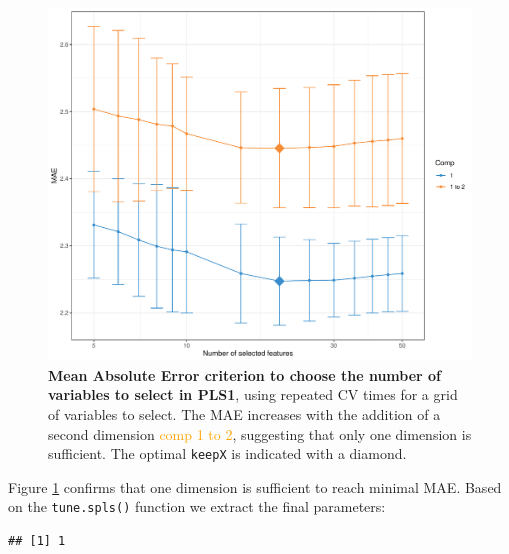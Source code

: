 \documentclass[
]{book}
\newenvironment{Shaded}{\begin{snugshade}}{\end{snugshade}}
\newcommand{\CommentTok}[1]{\textcolor[rgb]{0.56,0.35,0.01}{\textit{#1}}}
\newcommand{\DecValTok}[1]{\textcolor[rgb]{0.00,0.00,0.81}{#1}}
\newcommand{\NormalTok}[1]{#1}
\newcommand{\OtherTok}[1]{\textcolor[rgb]{0.56,0.35,0.01}{#1}}
\newcommand{\SpecialCharTok}[1]{\textcolor[rgb]{0.00,0.00,0.00}{#1}}
\begin{document}
\begin{figure}

{\centering \includegraphics[width=0.7\linewidth]{Figures/PLS/04-spls1-tuning-1} 

}

\caption{\textbf{Mean Absolute Error criterion to choose the number of variables to select in PLS1}, using repeated CV times for a grid of variables to select. The MAE increases with the addition of a second dimension \textcolor{orange}{comp 1 to 2}, suggesting that only one dimension is sufficient. The optimal \texttt{keepX} is indicated with a diamond.}\label{fig:04-spls1-tuning}
\end{figure}



Figure \ref{fig:04-spls1-tuning} confirms that one dimension is sufficient to reach minimal MAE. Based on the \texttt{tune.spls()} function we extract the final parameters:

\begin{Shaded}
\end{Shaded}

\begin{verbatim}
## [1] 1
\end{verbatim}
\end{document}
